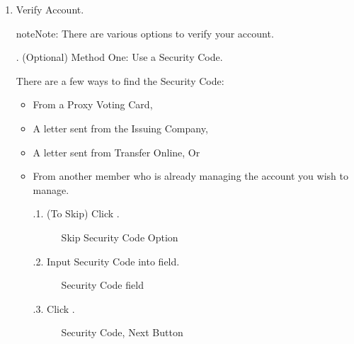 \documentclass[letterpaper,10pt,english]{sphinxmanual}
\begin{document}
\label{\detokenize{index:step-5}}\begin{enumerate}
%
\setcounter{enumi}{4}
\item {} 
\sphinxAtStartPar
Verify Account.

\begin{sphinxadmonition}{note}{Note:}
\sphinxAtStartPar
There are various options to verify your account.
\end{sphinxadmonition}

. (Optional) Method One: Use a Security Code.

\sphinxAtStartPar
There are a few ways to find the Security Code:
\begin{itemize}
\item {} 
\sphinxAtStartPar
From a Proxy Voting Card,

\item {} 
\sphinxAtStartPar
A letter sent from the Issuing Company,

\item {} 
\sphinxAtStartPar
A letter sent from Transfer Online, Or

\item {} 
\sphinxAtStartPar
From another member who is already managing the account you wish to manage.

.1. (To Skip) Click .

\begin{figure}[htbp]
\centering
\capstart

\noindent{}
\caption{Skip Security Code Option}\label{\detokenize{index:id8}}\end{figure}

.2. Input Security Code into  field.

\begin{figure}[htbp]
\centering
\capstart

\noindent{}
\caption{Security Code field}\label{\detokenize{index:id10}}\end{figure}

.3. Click .

\begin{figure}[htbp]
\centering
\capstart

\noindent{}
\caption{Security Code, Next Button}\label{\detokenize{index:id12}}\end{figure}


\end{itemize}
\end{enumerate}
\end{document}
